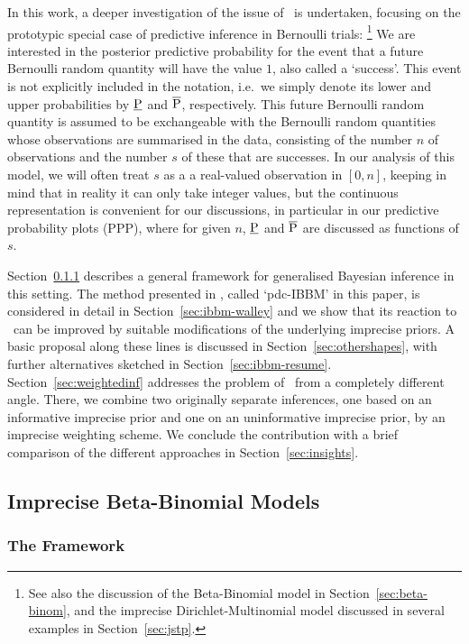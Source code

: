 In this work, a deeper investigation of the issue of \pdc\ is undertaken,
focusing on the prototypic special case of predictive inference in Bernoulli trials:%
\footnote{See also the discussion of the Beta-Binomial model in Section~\ref{sec:beta-binom},
and the imprecise Dirichlet-Multinomial model discussed in several examples in Section~\ref{sec:jstp}.}
We are interested in the posterior predictive
probability for the event that a future Bernoulli random quantity
will have the value $1$, also called a `success'. This event is not
explicitly included in the notation, i.e.\ we simply denote its lower
and upper probabilities by $\underline{\operatorname{P}}$ and $\overline{\operatorname{P}}$, respectively. This future Bernoulli random
quantity is assumed to be exchangeable with the Bernoulli random
quantities whose observations are summarised in the data, consisting
of the number $n$ of observations and the number $s$ of these that are
successes. In our analysis of this model, we
will often treat $s$ as a a real-valued observation in $[0,n]$,
keeping in mind that in reality it can only take %
integer values, but the continuous representation is convenient for
our discussions, in particular in our predictive probability plots (PPP),
where for given $n$, $\underline{\operatorname{P}}$ and $\overline{\operatorname{P}}$ are discussed as functions of $s$.

\medskip

Section~\ref{sec:ibbm-framework} describes a general framework for
generalised Bayesian inference in this setting. The method presented in \textcite[\S 5.4.3]{1991:walley},
called `pdc-IBBM' in this paper, is considered in detail in Section~\ref{sec:ibbm-walley}
and we show that its reaction to \pdc\ can be improved
by suitable modifications of the underlying imprecise
priors. A basic proposal along these lines is discussed in
Section~\ref{sec:othershapes}, with further alternatives
sketched in Section~\ref{sec:ibbm-resume}.
Section~\ref{sec:weightedinf} addresses the problem of \pdc\ from a
completely different angle. There, we combine two originally separate
inferences, one based on an informative imprecise prior and one
on an uninformative imprecise prior, by an imprecise weighting
scheme. We conclude the contribution with a brief comparison of the different
approaches in Section~\ref{sec:insights}.


\subsection{Imprecise Beta-Binomial Models}
\label{sec:ibbm}

\subsubsection{The Framework}
\label{sec:ibbm-framework}

